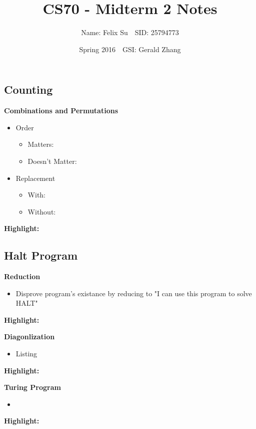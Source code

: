 \documentclass{article}\usepackage{amsmath,amssymb,amsthm,tikz,tkz-graph,color,chngpage,soul,hyperref,csquotes,graphicx,floatrow, listings}\newcommand*{\QEDB}{\hfill\ensuremath{\square}}\newtheorem*{prop}{Proposition}\renewcommand{\theenumi}{\alph{enumi}}\usepackage[shortlabels]{enumitem}\usepackage[nobreak=true]{mdframed}\usetikzlibrary{matrix,calc}\MakeOuterQuote{"}\usepackage[margin=0.75in]{geometry} \newtheorem{theorem}{Theorem}\newcommand{\Z}{\mathbb Z}\newcommand{\R}{\mathbb R}\newcommand{\Q}{\mathbb Q}\newcommand{\N}{\mathbb N}\newcommand{\x}[1]{\textrm{ #1 }}\newcommand{\pr}{\textrm{Pr}}
\title{CS70 - Midterm 2 Notes}
\author{Name: Felix Su$\quad$SID: 25794773}
\date{Spring 2016$\quad$GSI: Gerald Zhang}
\begin{document}
\maketitle

\subsection*{Counting}
\textbf{Combinations and Permutations}
\begin{itemize}
    \item Order
    \begin{itemize}
        \item Matters:
        \item Doesn't Matter:
    \end{itemize}
    \item Replacement
    \begin{itemize}
        \item With:
        \item Without:
    \end{itemize}
\end{itemize}
\begin{mdframed}
\textbf{Highlight:}
\end{mdframed}

\subsection*{Halt Program}
\textbf{Reduction}
\begin{itemize}
    \item Disprove program's existance by reducing to "I can use this program to solve HALT"
\end{itemize}
\begin{mdframed}
\textbf{Highlight:}
\end{mdframed}
\textbf{Diagonlization}
\begin{itemize}
    \item Listing
\end{itemize}
\begin{mdframed}
\textbf{Highlight:}
\end{mdframed}
\textbf{Turing Program}
\begin{itemize}
    \item 
\end{itemize}
\begin{mdframed}
\textbf{Highlight:}
\end{mdframed}
\end{document}
